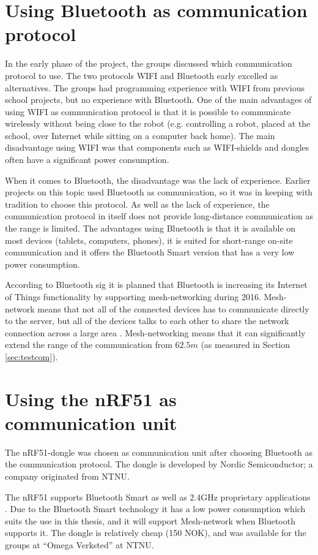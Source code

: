 \section{Using Bluetooth as communication protocol}
In the early phase of the project, the groups discussed which communication protocol to use. The two protocols WIFI and Bluetooth early excelled as alternatives. The groups had programming experience with WIFI from previous school projects, but no experience with Bluetooth. One of the main advantages of using WIFI as communication protocol is that it is possible to communicate wirelessly without being close to the robot (e.g. controlling a robot, placed at the school, over Internet while sitting on a computer back home). The main disadvantage using WIFI was that components such as WIFI-shields and dongles often have a significant power consumption.

When it comes to Bluetooth, the disadvantage was the lack of experience. Earlier projects on this topic used Bluetooth as communication, so it was in keeping with tradition to choose this protocol. As well as the lack of experience, the communication protocol in itself does not provide long-distance communication as the range is limited.  The advantages using Bluetooth is that it is available on most devices (tablets, computers, phones), it is suited for short-range on-site communication and it offers the Bluetooth Smart version that has a very low power consumption.

According to Bluetooth \acrshort{sig} \cite{mesh} it is planned that Bluetooth is increasing its Internet of Things functionality by supporting mesh-networking during 2016. Mesh-network means that not all of the connected devices has to communicate directly to the server, but all of the devices talks to each other to share the network connection across a large area \cite{howmesh}. Mesh-networking means that it can significantly extend the range of the communication from $62.5m$ (as measured in Section \ref{sec:testcom}).

\section{Using the nRF51 as communication unit}
The nRF51-dongle was chosen as communication unit after choosing Bluetooth as the communication protocol. The dongle is developed by Nordic Semiconductor; a  company originated from NTNU.

The nRF51 supports Bluetooth Smart as well as 2.4GHz proprietary applications \cite{nrf51Dongle}. Due to the Bluetooth Smart technology it has a low power consumption which suits the use in this thesis, and it will support Mesh-network when Bluetooth supports it. The dongle is relatively cheap (150 NOK), and was available for the groups at ``Omega Verksted'' at NTNU.

